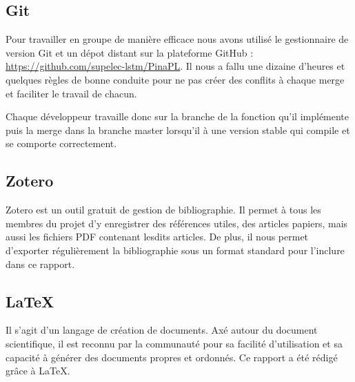 \subsection{Git}

Pour travailler en groupe de manière efficace nous avons utilisé le
gestionnaire de version Git et un dépot distant sur la plateforme GitHub :
\url{https://github.com/supelec-lstm/PinaPL}. Il nous a fallu une dizaine
d'heures et quelques règles de bonne conduite pour ne pas créer des conflits à
chaque merge et faciliter le travail de chacun.

\smallskip

Chaque développeur travaille donc sur la branche de la fonction qu'il
implémente puis la merge dans la branche master lorsqu'il à une version
stable qui compile et se comporte correctement.

\subsection{Zotero}

Zotero est un outil gratuit de gestion de bibliographie. Il permet à tous les
membres du projet d'y enregistrer des références utiles, des articles papiers,
mais aussi les fichiers PDF contenant lesdits articles.
De plus, il nous permet d'exporter régulièrement la bibliographie sous un
format standard pour l'inclure dans ce rapport.

\subsection{LaTeX}

Il s'agit d'un langage de création de documents. Axé autour du document
scientifique, il est reconnu par la communauté pour sa facilité d'utilisation
et sa capacité à générer des documents propres et ordonnés. Ce rapport a été
rédigé grâce à LaTeX.
